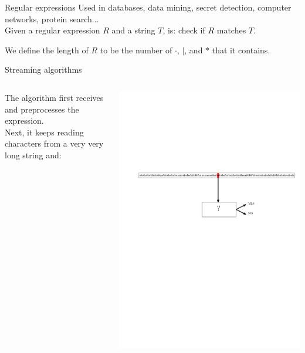 \begin{frame}{Regular expressions}
    \bigskip
    Used in databases, \pause data mining, \pause secret detection, \pause computer networks, \pause protein search\pause ...\\
    \pause
    \bigskip
    {
        Given a regular expression $R$ and a string $T$,  is: check if $R$ matches $T$.\\
    }
    
    
    \pause
    \medskip
    We define the length of $R$ to be the number of $\cdot$, $|$, and $\ast$ that it contains.
\end{frame}

\begin{frame}{Streaming algorithms}
\begin{columns}
    The algorithm first receives and preprocesses the expression.\\ Next, it keeps reading characters from a very very long string and:
    \begin{center}
        \includegraphics[width=\textwidth]{pictures/stream3}
    \end{center}
\end{columns}


\end{frame}
